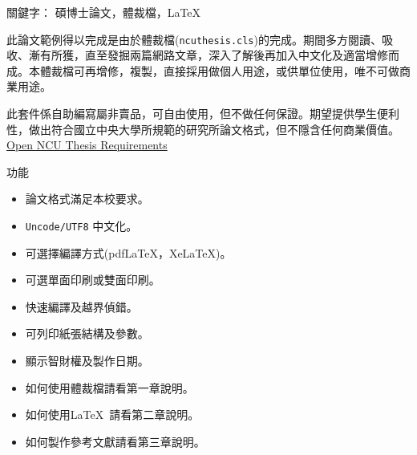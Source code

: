 \begin{abstractcn}


關鍵字： 碩博士論文，體裁檔，\LaTeX
\vspace{2em}

此論文範例得以完成是由於體裁檔({\tt ncuthesis.cls})的完成。期間多方閱讀、吸收、漸有所獲，直至發掘兩篇網路文章，深入了解後再加入中文化及適當增修而成。本體裁檔可再增修，複製，直接採用做個人用途，或供單位使用，唯不可做商業用途。

此套件係自助編寫屬非賣品，可自由使用，但不做任何保證。期望提供學生便利性，做出符合國立中央大學所規範的研究所論文格式，但不隱含任何商業價值。\href{./form03-02-02.doc}{Open NCU Thesis Requirements}
\begin{center}
功能
\end{center}
\begin{itemize}
\item 論文格式滿足本校要求。
\item {\tt Uncode/UTF8} 中文化。
\item 可選擇編譯方式(pdf\LaTeX，Xe\LaTeX)。
\item 可選單面印刷或雙面印刷。
\item 快速編譯及越界偵錯。
\item 可列印紙張結構及參數。
\item 顯示智財權及製作日期。
\item 如何使用體裁檔請看第一章說明。
\item 如何使用\LaTeX\ 請看第二章說明。
\item 如何製作參考文獻請看第三章說明。
\end{itemize}
\end{abstractcn} 